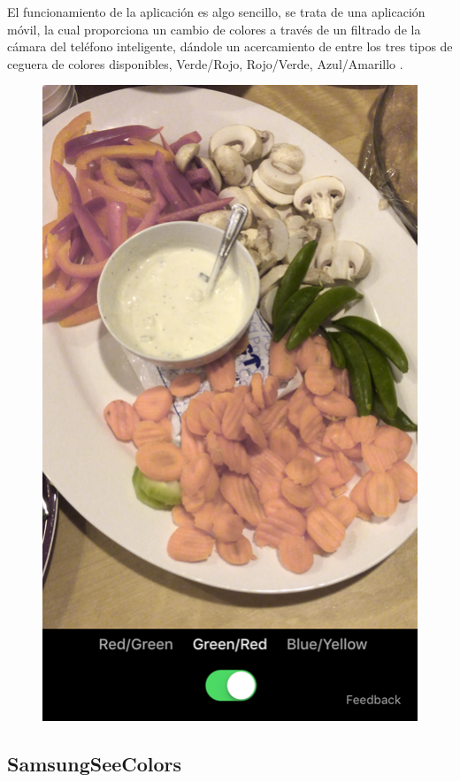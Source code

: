 \documentclass[10pt]{article}
\begin{document}
\setlength{\parskip}{2mm}

El funcionamiento de la aplicación es algo sencillo, se trata de una aplicación móvil, la cual proporciona un cambio de colores a través de un filtrado de la cámara del teléfono inteligente, dándole un acercamiento de entre los tres tipos de ceguera de colores disponibles, Verde/Rojo, Rojo/Verde, Azul/Amarillo \cite{IEEEreferencias:Ref18}.

\begin{figure}[H]
	\begin{center}
\includegraphics[scale =0.25]{Imagenes/Color_Binoculars_03-1.png}
	\end{center} 
\end{figure}

\subsection{Samsung\textregistered \space SeeColors }
\end{document}
